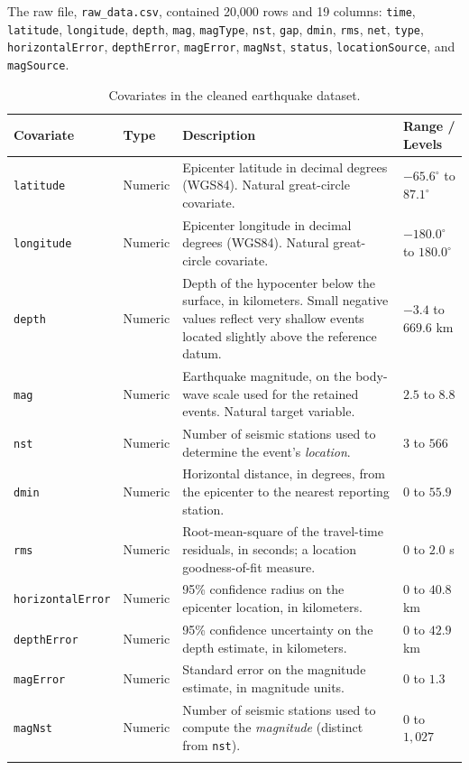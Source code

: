 \documentclass[10pt]{article}
\begin{document}
The raw file, \texttt{raw\_data.csv}\cite{repo}, contained 20{,}000 rows and 19 columns:
\texttt{time}, \texttt{latitude}, \texttt{longitude}, \texttt{depth}, \texttt{mag},
\texttt{magType}, \texttt{nst}, \texttt{gap}, \texttt{dmin}, \texttt{rms},
\texttt{net}, \texttt{type}, \texttt{horizontalError}, \texttt{depthError},
\texttt{magError}, \texttt{magNst}, \texttt{status}, \texttt{locationSource}, and
\texttt{magSource}.
\begin{table}[b!]
\centering
\small
\begin{tabular}{p{2.6cm}p{1.6cm}p{6.3cm}p{3.5cm}}
\toprule
\textbf{Covariate} & \textbf{Type} & \textbf{Description} & \textbf{Range / Levels} \\
\midrule
\texttt{latitude} & Numeric & Epicenter latitude in decimal degrees (WGS84). Natural great-circle covariate. & $-65.6^{\circ}$ to $87.1^{\circ}$ \\
\addlinespace
\texttt{longitude} & Numeric & Epicenter longitude in decimal degrees (WGS84). Natural great-circle covariate. & $-180.0^{\circ}$ to $180.0^{\circ}$ \\
\addlinespace
\texttt{depth} & Numeric & Depth of the hypocenter below the surface, in kilometers. Small negative values reflect very shallow events located slightly above the reference datum. & $-3.4$ to $669.6$ km \\
\addlinespace
\texttt{mag} & Numeric & Earthquake magnitude, on the body-wave scale used for the retained events. Natural target variable. & $2.5$ to $8.8$ \\
\addlinespace
\texttt{nst} & Numeric & Number of seismic stations used to determine the event's \emph{location}. & $3$ to $566$ \\
\addlinespace
\texttt{dmin} & Numeric & Horizontal distance, in degrees, from the epicenter to the nearest reporting station. & $0$ to $55.9$ \\
\addlinespace
\texttt{rms} & Numeric & Root-mean-square of the travel-time residuals, in seconds; a location goodness-of-fit measure. & $0$ to $2.0$ s \\
\addlinespace
\texttt{horizontal\allowbreak Error} & Numeric & 95\% confidence radius on the epicenter location, in kilometers. & $0$ to $40.8$ km \\
\addlinespace
\texttt{depthError} & Numeric & 95\% confidence uncertainty on the depth estimate, in kilometers. & $0$ to $42.9$ km \\
\addlinespace
\texttt{magError} & Numeric & Standard error on the magnitude estimate, in magnitude units. & $0$ to $1.3$ \\
\addlinespace
\texttt{magNst} & Numeric & Number of seismic stations used to compute the \emph{magnitude} (distinct from \texttt{nst}). & $0$ to $1{,}027$ \\
\addlinespace
\bottomrule
\end{tabular}
\caption{Covariates in the cleaned earthquake dataset.}
\label{tab:covariates}
\end{table}
\end{document}
